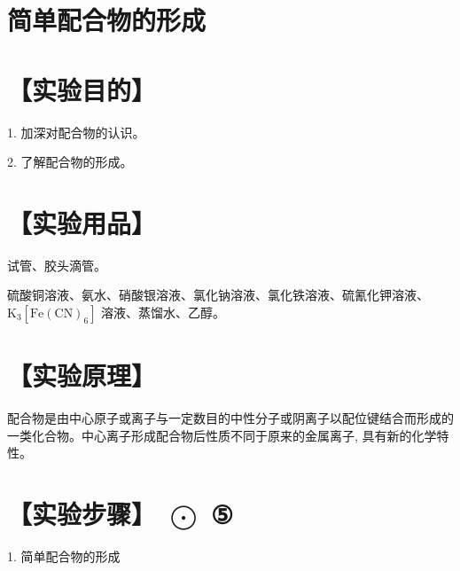 \documentclass[10pt]{article}
\begin{document}
\section*{简单配合物的形成}

\section*{【实验目的】}

1. 加深对配合物的认识。

2. 了解配合物的形成。

\section*{【实验用品】}

试管、胶头滴管。

硫酸铜溶液、氨水、硝酸银溶液、氯化钠溶液、氯化铁溶液、硫氰化钾溶液、 \({\mathrm{K}}_{3}\left\lbrack {\mathrm{{Fe}}{\left( \mathrm{{CN}}\right) }_{6}}\right\rbrack\) 溶液、蒸馏水、乙醇。

\section*{【实验原理】}

配合物是由中心原子或离子与一定数目的中性分子或阴离子以配位键结合而形成的一类化合物。中心离子形成配合物后性质不同于原来的金属离子, 具有新的化学特性。

\section*{【实验步骤】 \(\bigodot\) ⑤}

1. 简单配合物的形成

\begin{center}
\end{center}
\end{document}
